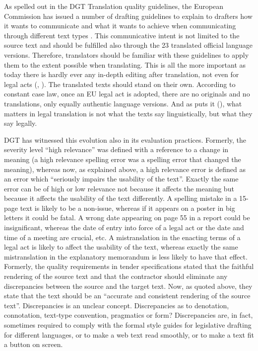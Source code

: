 \documentclass[output=paper]{langsci/langscibook}
\begin{document}
As spelled out in the DGT Translation quality guidelines, the European Commission has issued a number of drafting guidelines to explain to drafters how it wants to communicate and what it wants to achieve when communicating through different text types . This communicative intent is not limited to the source text and should be fulfilled also through the 23 translated official language versions. Therefore, translators should be familiar with these guidelines to apply them to the extent possible when translating. This is all the more important as today there is hardly ever any in-depth editing after translation, not even for legal acts (\citealt[62]{Guggeis2012}, \citealt{Strandvik2014}). The translated texts should stand on their own. According to constant case law, once an EU legal act is adopted, there are no originals and no translations, only equally authentic language versions. And as \citeauthor{Husa2012} puts it (\citeyear[179]{Husa2012}), what matters in legal translation is not what the texts say linguistically, but what they say legally. 

DGT has witnessed this evolution also in its evaluation practices. Formerly, the severity level ``high relevance'' was defined with  a reference to a change in meaning (a high relevance spelling error was a spelling error that changed the meaning), whereas now, as explained above, a high relevance error is defined as an error which ``seriously impairs the usability of the text''. Exactly the same error can be of high or low relevance not because it affects the meaning but because it affects the usability of the text differently. A spelling mistake in a 15-page text is likely to be a non-issue, whereas if it appears on a poster in big letters it could be fatal. A wrong date appearing on page 55 in a report could be insignificant, whereas the date of entry into force of a legal act or the date and time of a meeting are crucial, etc. A mistranslation in the enacting terms of a legal act is likely to affect the usability of the text, whereas exactly the same mistranslation in the explanatory memorandum is less likely to have that effect. Formerly, the quality requirements in tender specifications stated that the faithful rendering of the source text and that the contractor should eliminate any discrepancies between the source and the target text. Now, as quoted above, they state that the text should be an ``accurate and consistent rendering of the source text''. Discrepancies is an unclear concept. Discrepancies as to denotation, connotation, text-type convention, pragmatics or form? Discrepancies are, in fact, sometimes required to comply with the formal style guides for legislative drafting for different languages, or to make a web text read smoothly, or to make a text fit a button on screen.
\end{document}

